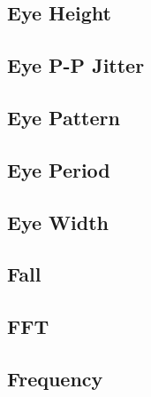 \subsection{Eye Height}

\pagebreak
\subsection{Eye P-P Jitter}

\pagebreak
\subsection{Eye Pattern}

\pagebreak
\subsection{Eye Period}

\pagebreak
\subsection{Eye Width}

\pagebreak
\subsection{Fall}

\pagebreak
\subsection{FFT}

\pagebreak
\subsection{Frequency}

